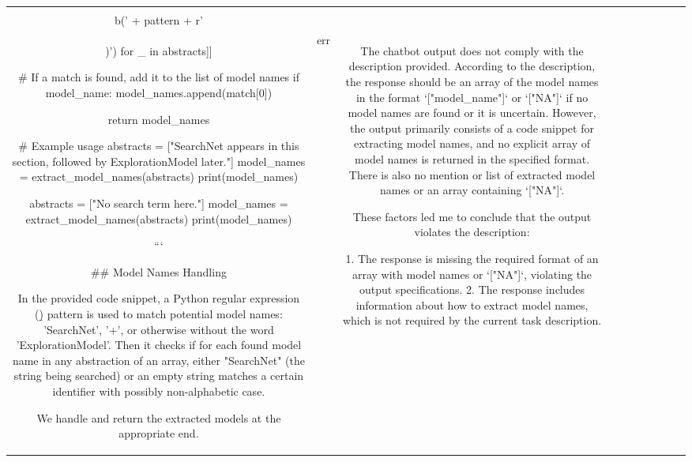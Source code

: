 \begin{table}[h!]
\begin{tabular}{|c|c|c|c|c|c|c|c|c|c|}
\[\[\[    # Find model names in the abstracts
    model_names = []
    for abstract in abstracts:
        matches = re.findall(pattern, abstract)
        
        # Check if either "SearchNet" or "\w+" was found
        model_name = [match[0] if match[1] in ['SearchNet', '': None] else match[1] 
                     for match in [match.match('\\b(' + pattern + r'\\)') for _ in abstracts]]
        
        # If a match is found, add it to the list of model names
        if model_name:
            model_names.append(match[0])
    
    return model_names

# Example usage
abstracts = ["SearchNet appears in this section, followed by ExplorationModel later."]
model_names = extract_model_names(abstracts)
print(model_names)

abstracts = ["No search term here."]
model_names = extract_model_names(abstracts)
print(model_names)

```

## Model Names Handling

In the provided code snippet, a Python regular expression (\b) pattern is used to match potential model names: 'SearchNet', '\w+', or otherwise without the word 'ExplorationModel'. Then it checks if for each found model name in any abstraction of an array,  either "SearchNet" (the string being searched) or an empty string matches a certain identifier with possibly non-alphabetic case.

We handle and return the extracted models at the appropriate end. & err & The chatbot output does not comply with the description provided. According to the description, the response should be an array of the model names in the format `["model_name"]` or `["NA"]` if no model names are found or it is uncertain. However, the output primarily consists of a code snippet for extracting model names, and no explicit array of model names is returned in the specified format. There is also no mention or list of extracted model names or an array containing `["NA"]`. 

These factors led me to conclude that the output violates the description:

1. The response is missing the required format of an array with model names or `["NA"]`, violating the output specifications.
2. The response includes information about how to extract model names, which is not required by the current task description.

\]\]\]
\end{tabular}
\end{table}
